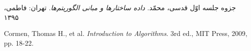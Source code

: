 

\begin{thebibliography}{99}
	جزوه جلسه اوّل
	قدسی، محمّد. \textit{داده ساختارها و مبانی الگوریتم‌ها}. تهران: فاطمی، ۱۳۹۵
	
	\begin{latin}	%
		
		Cormen, Thomas H., et al.
		\textit{Introduction to Algorithms}. 
		3rd ed., MIT Press, 2009, pp. 18-22. %
	\end{latin}	
\end{thebibliography}